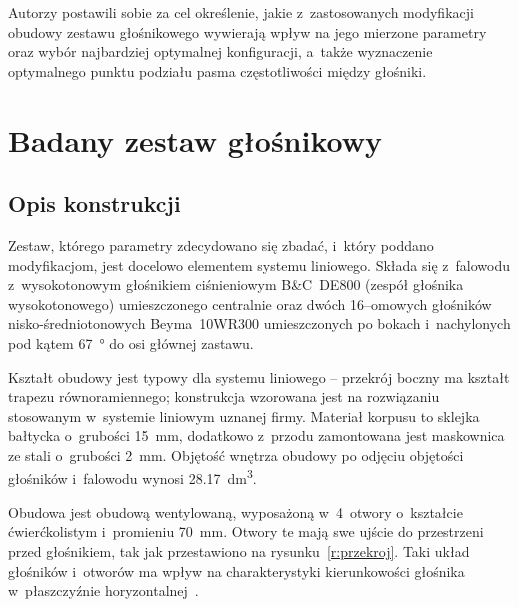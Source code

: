 \documentclass[12pt]{oska}
\newcommand{\comment}[1]{{\color{magenta}\emph{\textbf{#1}}}}
\begin{document}
	Autorzy postawili sobie za cel określenie, jakie z~zastosowanych modyfikacji obudowy zestawu głośnikowego wywierają wpływ na jego mierzone parametry oraz wybór najbardziej optymalnej konfiguracji, a~także wyznaczenie optymalnego punktu podziału pasma częstotliwości między głośniki.
	
	
	
	\section{Badany zestaw głośnikowy}
	
	\subsection{Opis konstrukcji}\label{ss:opis}
	
	Zestaw, którego parametry zdecydowano się zbadać, i~który poddano modyfikacjom, jest docelowo elementem systemu liniowego. Składa się z~falowodu z~wysokotonowym głośnikiem ciśnieniowym B\&C~DE800 (zespół głośnika wysokotonowego) umieszczonego centralnie oraz dwóch 16--omowych głośników nisko-średniotonowych Beyma~10WR300 umieszczonych po bokach i~nachylonych pod kątem \SI{67}{\degree} do osi głównej zastawu.
	
	Kształt obudowy jest typowy dla systemu liniowego -- przekrój boczny ma kształt trapezu równoramiennego; konstrukcja wzorowana jest na rozwiązaniu stosowanym w~systemie liniowym uznanej firmy. Materiał korpusu to sklejka bałtycka o~grubości \SI{15}{\milli\metre}, dodatkowo z~przodu zamontowana jest maskownica ze stali o~grubości \SI{2}{\milli\metre}. Objętość wnętrza obudowy po odjęciu objętości głośników i~falowodu wynosi \SI{28,17}{\deci\metre\cubed}.
	
	Obudowa jest obudową wentylowaną, wyposażoną w~4~otwory o~kształcie ćwierćkolistym i~promieniu \SI{70}{\milli\metre}. Otwory te mają swe ujście do przestrzeni przed głośnikiem, tak jak przestawiono na rysunku~\ref{r:przekroj}. %
	Taki układ głośników i~otworów ma wpływ na charakterystyki kierunkowości głośnika w~płaszczyźnie horyzontalnej~\cite{kmiecik_inz}. %
	
\end{document}
